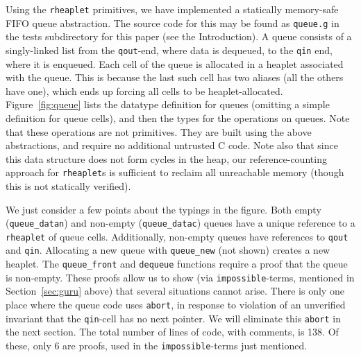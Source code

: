 \documentclass[9pt,natbib]{sigplanconf}
\begin{document}
Using the \texttt{rheaplet} primitives, we have implemented a
statically memory-safe FIFO queue abstraction.  The source code for
this may be found as \texttt{queue.g} in the tests subdirectory for
this paper (see the Introduction).  A queue consists of a
singly-linked list from the \texttt{qout}-end, where data is dequeued,
to the \texttt{qin} end, where it is enqueued.  Each cell of the queue
is allocated in a heaplet associated with the queue.  This is because
the last such cell has two aliases (all the others have one), which
ends up forcing all cells to be heaplet-allocated.
Figure~\ref{fig:queue} lists the datatype definition for queues
(omitting a simple definition for queue cells), and then the types for
the operations on queues.  Note that these operations are not
primitives.  They are built using the above abstractions, and require
no additional untrusted C code.  Note also that since this data
structure does not form cycles in the heap, our reference-counting
approach for \texttt{rheaplet}s is sufficient to reclaim all
unreachable memory (though this is not statically verified).

We just consider a few points about the typings in the figure.  Both
empty (\texttt{queue\_datan}) and non-empty (\texttt{queue\_datac})
queues have a unique reference to a \texttt{rheaplet} of queue cells.
Additionally, non-empty queues have references to \texttt{qout} and
\texttt{qin}.  Allocating a new queue with \texttt{queue\_new} (not
shown) creates a new heaplet.  The \texttt{queue\_front} and
\texttt{dequeue} functions require a proof that the queue is
non-empty.  These proofs allow us to show (via
\texttt{impossible}-terms, mentioned in Section~\ref{sec:guru} above)
that several situations cannot arise.  There is only one place where
the queue code uses \texttt{abort}, in response to violation of an
unverified invariant that the \texttt{qin}-cell has no next pointer.
We will eliminate this \texttt{abort} in the next section.  The total
number of lines of code, with comments, is 138.  Of these, only 6 are
proofs, used in the \texttt{impossible}-terms just mentioned.
\end{document}
